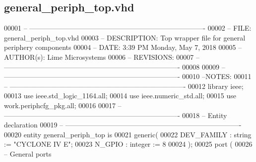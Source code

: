 \subsection{general\+\_\+periph\+\_\+top.\+vhd}
\label{general__periph__top_8vhd_source}

\begin{DoxyCode}
00001 \textcolor{keyword}{-- ----------------------------------------------------------------------------}
00002 \textcolor{keyword}{-- FILE:          general\_periph\_top.vhd}
00003 \textcolor{keyword}{-- DESCRIPTION:   Top wrapper file for general periphery components}
00004 \textcolor{keyword}{-- DATE:          3:39 PM Monday, May 7, 2018}
00005 \textcolor{keyword}{-- AUTHOR(s):     Lime Microsystems}
00006 \textcolor{keyword}{-- REVISIONS:}
00007 \textcolor{keyword}{-- ----------------------------------------------------------------------------}
00008 
00009 \textcolor{keyword}{-- ----------------------------------------------------------------------------}
00010 \textcolor{keyword}{--NOTES:}
00011 \textcolor{keyword}{-- ----------------------------------------------------------------------------}
00012 \textcolor{vhdlkeyword}{library }\textcolor{keywordflow}{ieee};
00013 \textcolor{vhdlkeyword}{use }ieee.std\_logic\_1164.\textcolor{keywordflow}{all};
00014 \textcolor{vhdlkeyword}{use }ieee.numeric\_std.\textcolor{keywordflow}{all};
00015 \textcolor{vhdlkeyword}{use }work.periphcfg_pkg.\textcolor{keywordflow}{all};
00016 
00017 \textcolor{keyword}{-- ----------------------------------------------------------------------------}
00018 \textcolor{keyword}{-- Entity declaration}
00019 \textcolor{keyword}{-- ----------------------------------------------------------------------------}
00020 \textcolor{keywordflow}{entity }general_periph_top \textcolor{keywordflow}{is}
00021    \textcolor{keywordflow}{generic}\textcolor{vhdlchar}{(}
00022       \textcolor{vhdlchar}{DEV_FAMILY}  \textcolor{vhdlchar}{:} \textcolor{comment}{string} \textcolor{vhdlchar}{:=} \textcolor{keyword}{"CYCLONE IV E"};
00023       \textcolor{vhdlchar}{N_GPIO}      \textcolor{vhdlchar}{:} \textcolor{comment}{integer} \textcolor{vhdlchar}{:=} \textcolor{vhdllogic}{}\textcolor{vhdllogic}{8}
00024    \textcolor{vhdlchar}{)};
00025    \textcolor{keywordflow}{port} \textcolor{vhdlchar}{(}
00026 \textcolor{keyword}{      -- General ports}

\end{DoxyCode}
